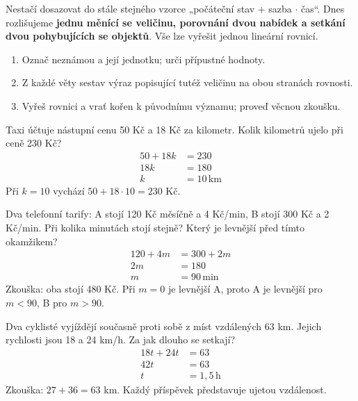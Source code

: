 \documentclass[11pt,a4paper]{article}
\begin{document}
Nestačí dosazovat do stále stejného vzorce „počáteční stav + sazba $\cdot$ čas“. Dnes rozlišujeme \textbf{jednu měnící se veličinu, porovnání dvou nabídek a setkání dvou pohybujících se objektů}. Vše lze vyřešit jednou lineární rovnicí.
\begin{enumerate}[label=\arabic*)]
\item Označ neznámou a její jednotku; urči přípustné hodnoty.
\item Z každé věty sestav výraz popisující tutéž veličinu na obou stranách rovnosti.
\item Vyřeš rovnici a vrať kořen k původnímu významu; proveď věcnou zkoušku.
\end{enumerate}
\begin{prikladReseniBox}[title={Příklad 1}]
Taxi účtuje nástupní cenu 50 Kč a 18 Kč za kilometr. Kolik kilometrů ujelo při ceně 230 Kč?
\tcblower
\[\begin{aligned}
50+18k&=230 \\
18k&=180 \\
k&=10\,\mathrm{km}
\end{aligned}\]
Při $k=10$ vychází $50+18\cdot10=230$ Kč.
\end{prikladReseniBox}
\begin{prikladReseniBox}[title={Příklad 2}]
Dva telefonní tarify: A stojí 120 Kč měsíčně a 4 Kč/min, B stojí 300 Kč a 2 Kč/min. Při kolika minutách stojí stejně? Který je levnější před tímto okamžikem?
\tcblower
\[\begin{aligned}
120+4m&=300+2m \\
2m&=180 \\
m&=90\,\mathrm{min}
\end{aligned}\]
Zkouška: oba stojí 480 Kč. Při $m=0$ je levnější A, proto A je levnější pro $m<90$, B pro $m>90$.
\end{prikladReseniBox}
\begin{prikladReseniBox}[title={Příklad 3}]
Dva cyklisté vyjíždějí současně proti sobě z míst vzdálených 63 km. Jejich rychlosti jsou 18 a 24 km/h. Za jak dlouho se setkají?
\tcblower
\[\begin{aligned}
18t+24t&=63 \\
42t&=63 \\
t&=1{,}5\,\mathrm{h}
\end{aligned}\]
Zkouška: $27+36=63$ km. Každý příspěvek představuje ujetou vzdálenost.
\end{prikladReseniBox}
\end{document}
